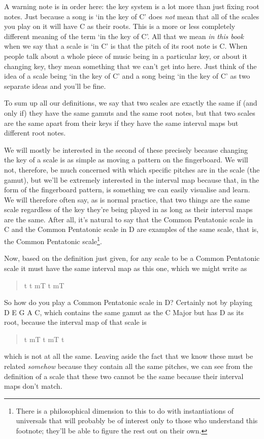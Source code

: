 \documentclass[english]{./gbook}
\begin{document}
\begin{large}
A warning note is in order here: the key system is a lot more than just fixing root notes. Just because a song is `in the key of C' does \emph{not} mean that all of the scales you play on it will have C as their roots. This is a more or less completely different meaning of the term `in the key of C'. All that we mean \emph{in this book} when we say that a scale is `in C' is that the pitch of its root note is C. When people talk about a whole piece of music being in a particular key, or about it changing key, they mean something that we can't get into here. Just think of the idea of a scale being `in the key of C' and a song being `in the key of C' as two separate ideas and you'll be fine.

To sum up all our definitions, we say that two scales are exactly the same if (and only if) they have the same gamuts and the same root notes, but that two scales are the same apart from their keys if they have the same interval maps but different root notes. 

We will mostly be interested in the second of these precisely because changing the key of a scale is as simple as moving a pattern on the fingerboard. We will not, therefore, be much concerned with which specific pitches are in the scale (the gamut), but we'll be extremely interested in the interval map because that, in the form of the fingerboard pattern, is something we can easily visualise and learn. We will therefore often say, as is normal practice, that two things are the same scale regardless of the key they're being played in as long as their interval maps are the same. After all, it's natural to say that the Common Pentatonic scale in C and the Common Pentatonic scale in D are examples of the same scale, that is, the Common Pentatonic scale\footnote{There is a philosophical dimension to this to do with instantiations of universals that will probably be of interest only to those who understand this footnote; they'll be able to figure the rest out on their own.}.

Now, based on the definition just given, for any scale to be a Common Pentatonic scale it must have the same interval map as this one, which we might write as 
\begin{quote}
	t t mT t mT
\end{quote}
So how do you play a Common Pentatonic scale in D? Certainly not by playing D E G A C, which contains the same gamut as the C Major but has D as its root, because the interval map of that scale is
\begin{quote}
	t mT t mT t
\end{quote}
which is not at all the same. Leaving aside the fact that we know these must be related \emph{somehow} because they contain all the same pitches, we can see from the definition of a scale that these two cannot be the same because their interval maps don't match. 


\end{large}
\end{document}
